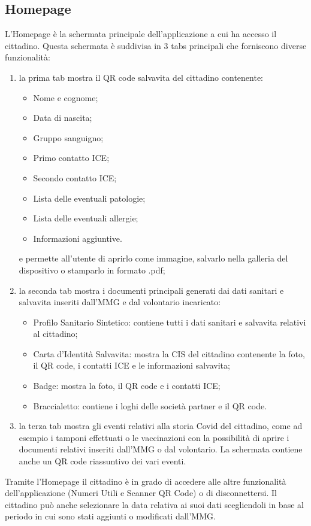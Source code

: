 \documentclass[12pt,a4paper,twoside,openright,titlepage]{book}
\begin{document}
\subsection{Homepage}
L'Homepage è la schermata principale dell'applicazione a cui ha accesso il cittadino. Questa schermata è suddivisa in 3 tabs principali che forniscono diverse funzionalità:
\begin{enumerate}
\item la prima tab mostra il QR code salvavita del cittadino contenente:
\begin{itemize}
\item Nome e cognome;
\item Data di nascita;
\item Gruppo sanguigno;
\item Primo contatto ICE;
\item Secondo contatto ICE;
\item Lista delle eventuali patologie;
\item Lista delle eventuali allergie;
\item Informazioni aggiuntive.
\end{itemize}
e permette all'utente di aprirlo come immagine, salvarlo nella galleria del dispositivo o stamparlo in formato .pdf;
\item la seconda tab mostra i documenti principali generati dai dati sanitari e salvavita inseriti dall'MMG e dal volontario incaricato:
\begin{itemize}
\item Profilo Sanitario Sintetico: contiene tutti i dati sanitari e salvavita relativi al cittadino;
\item Carta d'Identità Salvavita: mostra la CIS del cittadino contenente la foto, il QR code, i contatti ICE e le informazioni salvavita;
\item Badge: mostra la foto, il QR code e i contatti ICE;
\item Braccialetto: contiene i loghi delle società partner e il QR code.
\end{itemize}
\item la terza tab mostra gli eventi relativi alla storia Covid del cittadino, come ad esempio i tamponi effettuati o le vaccinazioni con la possibilità di aprire i documenti relativi inseriti dall'MMG o dal volontario. La schermata contiene anche un QR code riassuntivo dei vari eventi.
\end{enumerate}
Tramite l'Homepage il cittadino è in grado di accedere alle altre funzionalità dell'applicazione (Numeri Utili e Scanner QR Code) o di disconnettersi. Il cittadino può anche selezionare la data relativa ai suoi dati scegliendoli in base al periodo in cui sono stati aggiunti o modificati dall'MMG.
\end{document}
